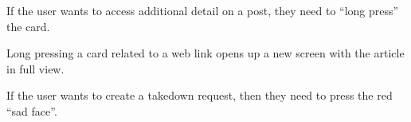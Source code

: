 \begin{minipage}{\textwidth}
  \centering
  \begin{minipage}[t]{4.6cm}
    \vspace{0pt}
    \centering
    \begin{minipage}{4.4cm}
      If the user wants to access additional detail on a post, they need to ``long press'' the card.
    \end{minipage}
  \end{minipage}
  \begin{minipage}[t]{4.6cm}
    \vspace{0pt}
    \centering
    \begin{minipage}{4.4cm}
      Long pressing a card related to a web link opens up a new screen with the article in full view.
    \end{minipage}
  \end{minipage}
  \begin{minipage}[t]{4.6cm}
    \vspace{0pt}
    \centering
    \begin{minipage}{4.4cm}
      If the user wants to create a takedown request, then they need to press the red ``sad face''.
    \end{minipage}
  \end{minipage}
\end{minipage}

